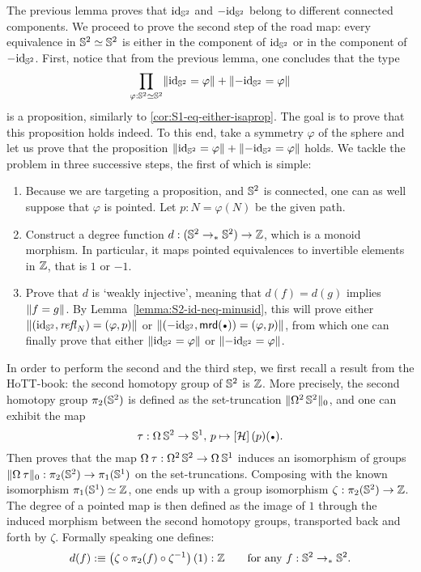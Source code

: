 \documentclass[english,a4]{article}
\renewcommand{\ap}[1]{\left[{#1}\right]}
\newcommand{\ptdto}{\to_\ast}%
\newcommand{\setTrunc}[1]{\Trunc{#1}_0}
\begin{document}
The previous lemma proves that $\mathord{\mathrm{id}}_{{\mathbb S^{2}}}$ and $-\mathord{\mathrm{id}}_{{\mathbb S^{2}}}$ belong 
to different connected components. We proceed to prove the second step
of the road map: every equivalence in ${{\mathbb S^{2}}} \simeq {{\mathbb S^{2}}}$ is
either in the component of $\mathord{\mathrm{id}}_{{\mathbb S^{2}}}$ or in the component of $-\mathord{\mathrm{id}}_{{\mathbb S^{2}}}$. 
First, notice that from the previous lemma, one concludes that the type 
\begin{displaymath}
  \prod_{\varphi:{{\mathbb S^{2}}}\simeq{{\mathbb S^{2}}}}\lVert\mathord{\mathrm{id}}_{{\mathbb S^{2}}} = \varphi\rVert + \lVert-\mathord{\mathrm{id}}_{{\mathbb S^{2}}} = \varphi\rVert
\end{displaymath}
is a proposition, similarly to \cref{cor:S1-eq-either-isaprop}. 
The goal is to prove that this proposition
holds indeed. To this end, take a symmetry $\varphi$ of the sphere and let us
prove that the proposition $\lVert\mathord{\mathrm{id}}_{{\mathbb S^{2}}} = \varphi\rVert + \lVert-\mathord{\mathrm{id}}_{{\mathbb S^{2}}} =
\varphi\rVert$ holds. We tackle the problem in three successive steps,
the first of which is simple: 
\begin{enumerate}
  \item Because we are targeting a proposition, and ${{\mathbb S^{2}}}$ is
    connected, one can as well suppose that $\varphi$ is pointed. 
    Let $p:N=\varphi(N)$ be the given path.
  \item Construct a degree function $d: (\Sp \ptdto \Sp) \to \ZZ$, which is a
    monoid morphism. In particular, it maps pointed equivalences to invertible
    elements in $\mathbb{Z}$, that is $1$ or $-1$.
  \item Prove that $d$ is `weakly injective', meaning that $d(f)=d(g)$ 
    implies $\lVert f=g\rVert$. By Lemma~\ref{lemma:S2-id-neq-minusid},
    this will prove either $\lVert(\mathord{\mathrm{id}}_{{\mathbb S^{2}}},\mathop{{\mathit{refl}}_{N}})=(\varphi,p)\rVert$ 
    or $\Trunc{(-\id_\Sp,\mrd(\base))=(\varphi,p)}$, from which
    one can finally prove that either $\lVert\mathord{\mathrm{id}}_{{\mathbb S^{2}}} = \varphi\rVert$ or
    $\lVert-\mathord{\mathrm{id}}_{{\mathbb S^{2}}} = \varphi\rVert$.\label{it:weakly_injective}
\end{enumerate}

In order to perform the second and the third step, we first recall a result from the
HoTT-book: the second homotopy group of ${{\mathbb S^{2}}}$ is $\mathbb{Z}$. More precisely, the
second homotopy group $\pi_2({{\mathbb S^{2}}})$ is defined as the set-truncation
$\setTrunc{\loopspace 2 \Sp}$, and one can exhibit the map
\begin{displaymath}
  \tau: \loopspace\null\Sp \to \Sc, \, p \mapsto \ap\hopf(p)(\base).
\end{displaymath}
Then \cite[Section 8.4 and 8.5]{HoTT} proves that the map $\loopspace\null\tau :
\loopspace 2 \Sp \to \loopspace \null \Sc$ induces an isomorphism of groups
$\setTrunc{\loopspace\null\tau}: \pi_2(\Sp) \to \pi_1(\Sc)$ on the set-truncations.
Composing with the known isomorphism $\pi_1({{\mathbb S^{1}}}) \simeq \mathbb{Z}$, one
ends up with a group isomorphism $\zeta: \pi_2({{\mathbb S^{2}}}) \to \mathbb{Z}$. The degree of a
pointed map is then defined as the image of $1$ through the induced morphism
between the second homotopy groups, transported back and forth by $\zeta$. 
Formally speaking one defines: 
\begin{displaymath}
  d(f) \defequi \left(\zeta\circ\pi_2(f)\circ \inv\zeta\right)(1):\ZZ \qquad
  \text{for any}\ f:\Sp\ptdto\Sp.
\end{displaymath}
\end{document}
